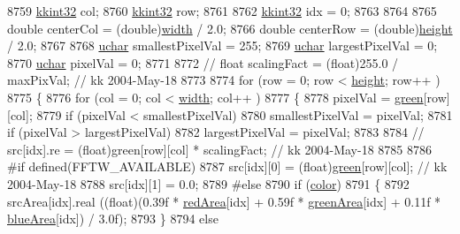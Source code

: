 \begin{DoxyCode}
8759   \hyperlink{namespace_k_k_b_a8fa4952cc84fda1de4bec1fbdd8d5b1b}{kkint32}  col;
8760   \hyperlink{namespace_k_k_b_a8fa4952cc84fda1de4bec1fbdd8d5b1b}{kkint32}  row;
8761 
8762   \hyperlink{namespace_k_k_b_a8fa4952cc84fda1de4bec1fbdd8d5b1b}{kkint32}  idx = 0;
8763 
8764 
8765   \textcolor{keywordtype}{double}  centerCol = (double)\hyperlink{class_k_k_b_1_1_raster_ae0bcc103e191c3421d7692dc69ceb554}{width}  / 2.0;
8766   \textcolor{keywordtype}{double}  centerRow = (double)\hyperlink{class_k_k_b_1_1_raster_af39ff189de4fbb6de98392e187efafb7}{height} / 2.0;
8767 
8768   \hyperlink{namespace_k_k_b_ace9969169bf514f9ee6185186949cdf7}{uchar}  smallestPixelVal = 255;
8769   \hyperlink{namespace_k_k_b_ace9969169bf514f9ee6185186949cdf7}{uchar}  largestPixelVal  = 0;
8770   \hyperlink{namespace_k_k_b_ace9969169bf514f9ee6185186949cdf7}{uchar}  pixelVal         = 0;
8771 
8772   \textcolor{comment}{// float scalingFact = (float)255.0 / maxPixVal;   // kk  2004-May-18}
8773 
8774   \textcolor{keywordflow}{for}  (row = 0; row < \hyperlink{class_k_k_b_1_1_raster_af39ff189de4fbb6de98392e187efafb7}{height}; row++ )
8775   \{
8776     \textcolor{keywordflow}{for} (col = 0; col < \hyperlink{class_k_k_b_1_1_raster_ae0bcc103e191c3421d7692dc69ceb554}{width}; col++ )
8777     \{     
8778       pixelVal = \hyperlink{class_k_k_b_1_1_raster_a2d2238911145488e226cd2e34fc8448c}{green}[row][col];
8779       \textcolor{keywordflow}{if}  (pixelVal < smallestPixelVal)
8780         smallestPixelVal = pixelVal;
8781       \textcolor{keywordflow}{if}  (pixelVal > largestPixelVal)
8782         largestPixelVal = pixelVal;
8783 
8784       \textcolor{comment}{// src[idx].re = (float)green[row][col] * scalingFact;  // kk 2004-May-18}
8785 
8786 \textcolor{preprocessor}{      #if  defined(FFTW\_AVAILABLE)}
8787         src[idx][0] = (float)\hyperlink{class_k_k_b_1_1_raster_a2d2238911145488e226cd2e34fc8448c}{green}[row][col];                   \textcolor{comment}{// kk 2004-May-18}
8788         src[idx][1] = 0.0;
8789 \textcolor{preprocessor}{      #else}
8790         \textcolor{keywordflow}{if}  (\hyperlink{class_k_k_b_1_1_raster_a482384d89cc53fa4f36276307c746854}{color})
8791         \{
8792           srcArea[idx].real ((\textcolor{keywordtype}{float})(0.39f * \hyperlink{class_k_k_b_1_1_raster_aaef16f7d4dc7c8b99e84176d0babd731}{redArea}[idx] + 0.59f * 
      \hyperlink{class_k_k_b_1_1_raster_ad981258f1f7284a8bd0cd0466f328cdf}{greenArea}[idx] + 0.11f * \hyperlink{class_k_k_b_1_1_raster_af7996dfe61613e5ecf91454175bfe3f1}{blueArea}[idx]) / 3.0f);
8793         \}
8794         \textcolor{keywordflow}{else}

\end{DoxyCode}
